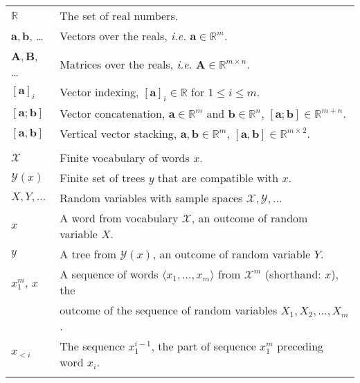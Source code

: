 \documentclass[11pt]{article}
\begin{document}
\begin{table}[h]
\center

  \begin{tabular}{l|l}
    \hline\hline
    $\mathbb{R}$  & The set of real numbers.   \\
    $\mathbf{a}, \mathbf{b}$, \dots  & Vectors over the reals, \textit{i.e.} $\mathbf{a} \in \mathbb{R}^m$.  \\
    $\mathbf{A}, \mathbf{B}$, \dots & Matrices over the reals, \textit{i.e.} $\mathbf{A} \in \mathbb{R}^{m \times n}$.   \\
    $[\mathbf{a}]_i$ & Vector indexing, $[\mathbf{a}]_i \in \mathbb{R}$ for $1 \leq i \leq m$. \\
    $[\mathbf{a}; \mathbf{b}]$ & Vector concatenation, $\mathbf{a} \in \mathbb{R}^{m}$ and $\mathbf{b} \in \mathbb{R}^{n}$, $[\mathbf{a}; \mathbf{b}] \in \mathbb{R}^{m+n}$.  \\
    $[\mathbf{a}, \mathbf{b}]$  & Vertical vector stacking, $\mathbf{a}, \mathbf{b} \in \mathbb{R}^{m}$, $[\mathbf{a}, \mathbf{b}] \in \mathbb{R}^{m \times 2}$.  \\
    & \\

    $\mathcal{X}$ & Finite vocabulary of words $x$. \\
    $\mathcal{Y}(x)$ & Finite set of trees $y$ that are compatible with $x$.  \\
    $X, Y, \dots$ & Random variables with sample spaces $\mathcal{X}, \mathcal{Y}, \dots$  \\
    $x$ & A word from vocabulary $\mathcal{X}$, an outcome of random variable $X$.   \\
    $y$ & A tree from $\mathcal{Y}(x)$, an outcome of random variable $Y$.  \\
    $x_1^m$, $x$ & A sequence of words $\langle x_1, \dots, x_m \rangle$ from $\mathcal{X}^m$ (shorthand: $x$), the \\ & outcome of the sequence of random variables $X_1, X_2, \dots, X_m$.   \\
    $x_{<i}$ & The sequence $x_{1}^{i-1}$, the part of sequence $x_1^m$ preceding word $x_i$.  \\
    & \\



\end{tabular}
\end{table}
\end{document}
